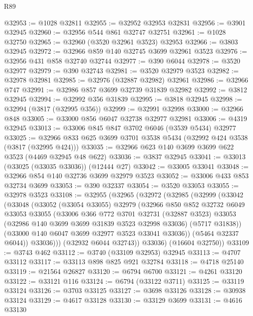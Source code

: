 \begin{lexlean}{R89}
\begin{coremodule}
@32953 := @1028 @32811
@32955 := @32952 @32953 @32831
@32956 := @3901 @32945
@32960 := @32956 @544 @861 @32747 @32751
@32961 := @1028 @32750
@32965 := @32960 (@3520 @32961 @3523) @32953
@32966 := @3803 @32945
@32972 := @32966 @859 @140 @32745 @3699 @32961 @3523
@32976 := @32956 @431 @858 @32740 @32744
@32977 := @390 @6044
@32978 := @3520 @32977
@32979 := @390 @32743
@32981 := @3520 @32979 @3523
@32982 := @32978 @32981
@32985 := @32976 (@32887 @32982) @32961
@32986 := @32966 @747
@32991 := @32986 @857 @3699 @32739 @31839 @32982
@32992 := @3812 @32945
@32994 := @32992 @356 @31839
@32995 := @3818 @32945
@32998 := @32994 (@3817 (@32995 @356))
@32999 := @32991 @32998
@33000 := @32966 @848
@33005 := @33000 @856 @6047 @32738 @32977 @32981
@33006 := @4319 @32945
@33013 := @33006 @845 @847 @3702 @6046 (@3539 @5434) @32977
@33025 := @32966 @833 @625 @3699 @3701 @3538 @5434 (@32992 @424 @3538 (@3817 (@32995 @424)))
@33035 := @32966 @623 @140 @3699 @3699 @622 @3523 (@4469 @32945 @48 @622)
@33036 := @3837 @32945
@33041 := @33013 (@33025 (@33035 @33036)) (@12444 @27)
@33042 := @33005 @33041
@33048 := @32966 @854 @140 @32736 @3699 @32979 @3523
@33052 := @33006 @433 @853 @32734 @3699
@33053 := @390 @32337
@33054 := @3520 @33053
@33055 := @32978 @3523
@33108 := @32955
    (@32965
      (@32972
        (@32985
          (@32999
            (@33042
              (@33048
                (@33052
                  (@33054 @33055)
                  @32979
                  (@32966
                    @850
                    @852
                    @32732
                    @6049
                    @33053
                    @33055
                    (@33006
                      @366
                      @772
                      @3701
                      @32731
                      (@32887 @3523)
                      @33053
                      (@32986 @140 @3699 @3699 @31839 @3523 @32998 @33036)
                      (@5717 @31838))
                    (@33000 @140 @6047 @3699 @32977 @3523 @33041 @33036))
                  (@5464 @32337 @6044))
                @33036)))
          (@32932 @6044 @32743))
        @33036)
      (@16604 @32750))
@33109 := @3743 @462
@33112 := @3740 (@33109 @32953) @32945
@33113 := @4707 @33112
@33117 := @33113 @898 @825 @921 @32784
@33118 := @4718 @25140
@33119 := @21564 @26827
@33120 := @6794 @6700
@33121 := @4261 @33120
@33122 := @33121 @116
@33124 := @6794 (@33122 @3711)
@33125 := @33119 @33124
@33126 := @3703 @33125
@33127 := @3698 @33126
@33128 := @30938 @33124
@33129 := @4617 @33128
@33130 := @33129 @3699
@33131 := @4616 @33130

\end{coremodule}
\end{lexlean}
